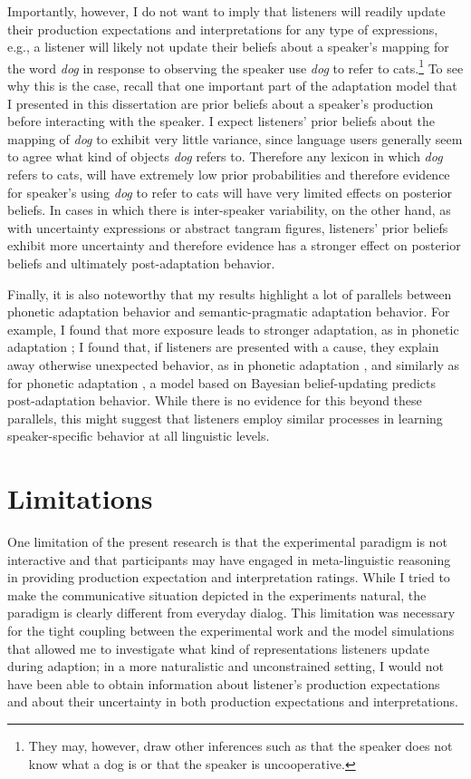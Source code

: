 Importantly, however, I do not want to imply that listeners will readily update their production expectations and interpretations for any type of expressions, e.g., a listener will likely not
update their beliefs about a speaker's mapping for the word \textit{dog} in response to observing the speaker use \textit{dog} to refer to cats.\footnote{They may, however, draw other inferences such as that the speaker does not know what a dog is or that the speaker is uncooperative.} To see why this is the case, recall that one important part of the adaptation model that I presented in this dissertation are prior beliefs about a speaker's production before interacting with the speaker. I expect listeners' prior beliefs about the mapping of \textit{dog} to exhibit very little variance, since language users generally seem to agree what kind of objects \textit{dog} refers to. Therefore any lexicon in which \textit{dog} refers to cats, will have extremely low prior probabilities and therefore evidence for speaker's using \textit{dog} to refer to cats will have very limited effects on posterior beliefs. In cases in which there is inter-speaker variability, on the other hand, as with uncertainty expressions or abstract tangram figures, listeners' prior beliefs exhibit more uncertainty and therefore evidence has a stronger effect on posterior beliefs and ultimately post-adaptation behavior.

Finally, it is also noteworthy that my results highlight a lot of parallels between phonetic adaptation behavior and semantic-pragmatic adaptation behavior. For example, I found that more exposure leads to stronger adaptation, as in phonetic adaptation \parencite{Vroomen2007}; I found that,  if listeners are presented with a cause,  they explain away otherwise unexpected behavior, as in phonetic adaptation \parencite{Kraljic2008}, and similarly as for phonetic adaptation \parencite{Kleinschmidt2015}, a model based on Bayesian belief-updating predicts post-adaptation behavior. While there is no evidence for this beyond these parallels, this might suggest that listeners employ similar processes in learning speaker-specific behavior at all linguistic levels.



\section{Limitations}

One limitation of the present research is that the experimental paradigm is not interactive and that participants may have 
engaged in meta-linguistic reasoning in providing production expectation and interpretation ratings. 
While I tried to make the communicative situation depicted in the experiments natural,
the paradigm is clearly different from everyday dialog. This limitation was necessary for the tight coupling between the experimental work
and the model simulations that allowed me to investigate what kind of representations listeners update during adaption; in a more
naturalistic and unconstrained setting, I would not have been able to obtain information about listener's production expectations and about their
uncertainty in both production expectations and interpretations. 

